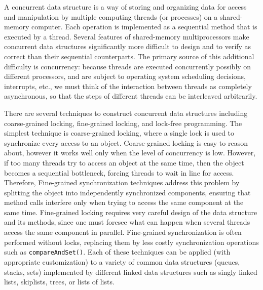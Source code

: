 A concurrent data structure is a way of storing and organizing data for access and manipulation by multiple computing threads (or processes) on a shared-memory computer. Each operation is implemented as a sequential
method that is executed by a thread. Several features of shared-memory multiprocessors make concurrent data structures significantly more difficult to design and to verify as correct than their sequential counterparts. The primary source of this additional difficulty is concurrency: because threads are executed concurrently possibly on different processors, and are subject to operating system scheduling decisions, interrupts, etc., we must think of the interaction between threads as completely asynchronous, so that the steps of different threads can be interleaved arbitrarily. %



There are several techniques to construct concurrent data structures including coarse-grained locking, fine-grained locking, and lock-free programming. The simplest technique is coarse-grained locking, where a single lock is used to synchronize every access to an object. Coarse-grained locking is easy to reason about, however it works well only when the level of concurrency is low. However, if too many threads try to access an object at the same time, then the object becomes a sequential bottleneck, forcing threads to wait in line for access. Therefore, Fine-grained synchronization techniques address this problem by splitting the object into independently synchronized components, ensuring that method calls interfere only when trying to access the same component at the same time. Fine-grained locking requires very careful design of the data structure and its
methods, since one must foresee what can happen when several threads access
the same component in parallel.
Fine-grained synchronization is often performed without locks, replacing them by less costly
synchronization operations such as {\tt compareAndSet()}. Each of these techniques can be applied (with appropriate customization) to a variety of common data structures (queues, stacks, sets) implemented by different linked data structures such as singly linked lists, skiplists, trees, or lists of lists. 


\vspace{1cm}





